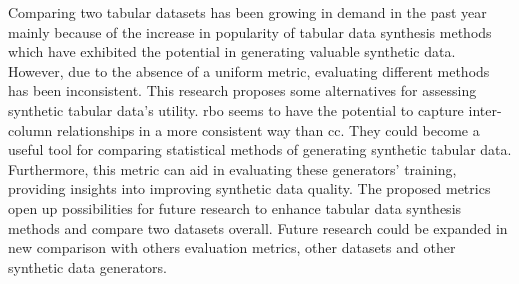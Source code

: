 
Comparing two tabular datasets has been growing in demand in the past year mainly because of the increase in popularity of tabular data synthesis methods which have exhibited the potential in generating valuable synthetic data. However, due to the absence of a uniform metric, evaluating different methods has been inconsistent. This research proposes some alternatives for assessing synthetic tabular data's utility. \ac{rbo} seems to have the potential to capture inter-column relationships in a more consistent way than \ac{cc}. They could become a useful tool for comparing statistical methods of generating synthetic tabular data. Furthermore, this metric can aid in evaluating these generators' training, providing insights into improving synthetic data quality. The proposed metrics open up possibilities for future research to enhance tabular data synthesis methods and compare two datasets overall. Future research could be expanded in new comparison with others evaluation metrics, other datasets and other synthetic data generators.